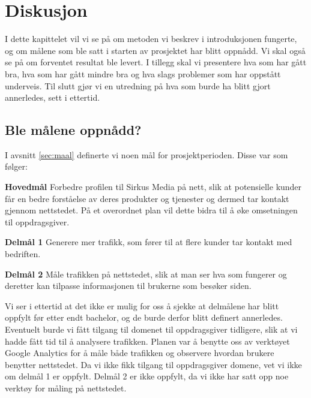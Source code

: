 \cleardoublepage
\chapter{Diskusjon}
\label{chap:discussion} 

I dette kapittelet vil vi se på om metoden vi beskrev i introduksjonen fungerte, og om målene som ble satt i starten av prosjektet har blitt oppnådd. Vi skal også se på om forventet resultat ble levert. I tillegg skal vi presentere hva som har gått bra, hva som har gått mindre bra og hva slags problemer som har oppstått underveis. Til slutt gjør vi en utredning på hva som burde ha blitt gjort annerledes, sett i ettertid.

\section{Ble målene oppnådd?}
I avsnitt \ref{sec:maal} definerte vi noen mål for prosjektperioden. Disse var som følger:

\begin{compactitem}
    \item [{\bf Hovedmål}] Forbedre profilen til Sirkus Media på nett, slik at potensielle kunder får en bedre forståelse av deres produkter og tjenester og dermed tar kontakt gjennom nettstedet. På et overordnet plan vil dette bidra til å øke omsetningen til oppdragsgiver.
    \begin{compactitem}
        \item [{\bf  Delmål 1} ] Generere mer trafikk, som fører til at flere kunder tar kontakt med bedriften. 
        \item [{\bf  Delmål 2} ] Måle trafikken på nettstedet, slik at man ser hva som fungerer og deretter kan tilpasse informasjonen til brukerne som besøker siden.
    \end{compactitem}
\end{compactitem}

Vi ser i ettertid at det ikke er mulig for oss å sjekke at delmålene har blitt oppfylt før etter endt bachelor, og de burde derfor blitt definert annerledes. Eventuelt burde vi fått tilgang til domenet til oppdragsgiver tidligere, slik at vi hadde fått tid til å analysere trafikken. Planen var å benytte oss av verktøyet Google Analytics for å måle både trafikken og observere hvordan brukere benytter nettstedet. Da vi ikke fikk tilgang til oppdragsgiver domene, vet vi ikke om delmål 1 er oppfylt. Delmål 2 er ikke oppfylt, da vi ikke har satt opp noe verktøy for måling på nettstedet.

